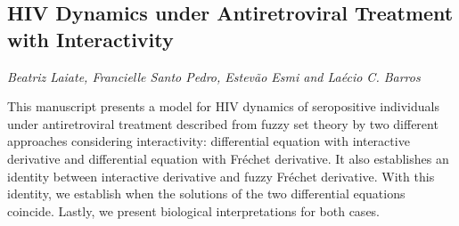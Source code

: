 \documentclass[../booklet.tex]{subfiles}
\begin{document}
\subsection[HIV Dynamics under Antiretroviral Treatment with Interactivity. {\it Beatriz Laiate, Francielle Santo Pedro, Estevão Esmi and Laécio C. Barros}]{HIV Dynamics under Antiretroviral Treatment with Interactivity}
   

\begin{center}
  {\it Beatriz Laiate, Francielle Santo Pedro, Estevão Esmi and Laécio C. Barros}
\end{center}



This manuscript presents a model for HIV dynamics of seropositive individuals under antiretroviral treatment described from fuzzy set theory by two different approaches considering interactivity: differential equation with interactive derivative and differential equation with Fr\'echet derivative. It also establishes an identity between interactive derivative and fuzzy Fr\'echet derivative. With this identity, we establish when the solutions of the two differential equations coincide. Lastly, we present biological interpretations for both cases.

\end{document}
